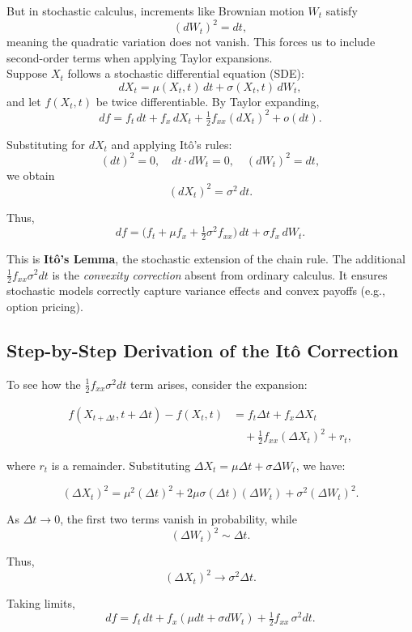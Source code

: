 \documentclass[10pt,twocolumn]{article}
\begin{document}
But in stochastic calculus, increments like Brownian motion $W_t$ satisfy
\[
(dW_t)^2 = dt,
\]
meaning the quadratic variation does not vanish. This forces us to include second-order terms when applying Taylor expansions.\\ 

Suppose $X_t$ follows a stochastic differential equation (SDE):
\[
dX_t = \mu(X_t,t)\,dt + \sigma(X_t,t)\, dW_t,
\]
and let $f(X_t,t)$ be twice differentiable. By Taylor expanding,
\[
df = f_t\, dt + f_x\, dX_t + \tfrac{1}{2} f_{xx} (dX_t)^2 + o(dt).
\]

Substituting for $dX_t$ and applying It\^o's rules:
\[
(dt)^2 = 0, \quad dt \cdot dW_t = 0, \quad (dW_t)^2 = dt,
\]
we obtain
\[
(dX_t)^2 = \sigma^2\, dt.
\]

Thus,
\[
df = \Big(f_t + \mu f_x + \tfrac{1}{2}\sigma^2 f_{xx}\Big)\, dt + \sigma f_x\, dW_t.
\]

This is \textbf{It\^o's Lemma}, the stochastic extension of the chain rule. The additional 
$\tfrac{1}{2} f_{xx}\sigma^2 dt$ is the \emph{convexity correction} absent from ordinary calculus. 
It ensures stochastic models correctly capture variance effects and convex payoffs (e.g., option pricing).

\subsection{Step-by-Step Derivation of the It\^o Correction}

To see how the $\tfrac{1}{2} f_{xx}\sigma^2 dt$ term arises, consider the expansion:

\begin{align*}
f(X_{t+\Delta t},t+\Delta t) - f(X_t,t) 
&= f_t \Delta t + f_x \Delta X_t \\[-2pt]
&\quad + \tfrac{1}{2} f_{xx} (\Delta X_t)^2 + r_t,
\end{align*}

where $r_t$ is a remainder. Substituting $\Delta X_t = \mu \Delta t + \sigma \Delta W_t$, we have:

\[
(\Delta X_t)^2 = \mu^2 (\Delta t)^2 + 2\mu\sigma (\Delta t)(\Delta W_t) + \sigma^2 (\Delta W_t)^2.
\]

As $\Delta t \to 0$, the first two terms vanish in probability, while 
\[
(\Delta W_t)^2 \sim \Delta t.
\]

Thus,
\[
(\Delta X_t)^2 \to \sigma^2 \Delta t.
\]

Taking limits,
\[
df = f_t\, dt + f_x (\mu dt + \sigma dW_t) + \tfrac{1}{2} f_{xx}\, \sigma^2 dt.
\]
\end{document}
